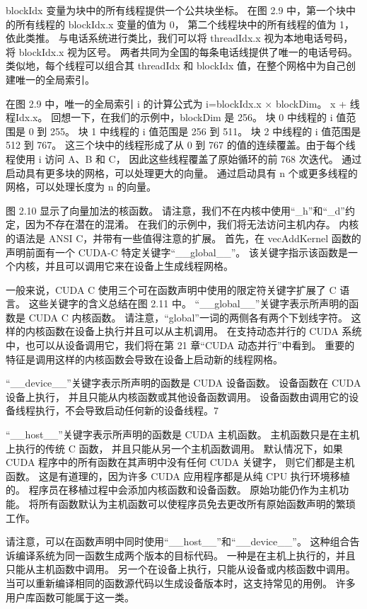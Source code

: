 blockIdx 变量为块中的所有线程提供一个公共块坐标。 在图 2.9 中，第一个块中的所有线程的 blockIdx.x 变量的值为 0，
第二个线程块中的所有线程的值为 1，依此类推。 与电话系统进行类比，我们可以将 threadIdx.x 视为本地电话号码，
将 blockIdx.x 视为区号。 两者共同为全国的每条电话线提供了唯一的电话号码。 
类似地，每个线程可以组合其 threadIdx 和 blockIdx 值，在整个网格中为自己创建唯一的全局索引。

在图 2.9 中，唯一的全局索引 i 的计算公式为 i=blockIdx.x × blockDim。 x + 线程Idx.x。 
回想一下，在我们的示例中，blockDim 是 256。 块 0 中线程的 i 值范围是 0 到 255。 
块 1 中线程的 i 值范围是 256 到 511。 块 2 中线程的 i 值范围是 512 到 767。 
这三个块中的线程形成了从 0 到 767 的值的连续覆盖。由于每个线程使用 i 访问 A、B 和 C，
因此这些线程覆盖了原始循环的前 768 次迭代。 通过启动具有更多块的网格，可以处理更大的向量。 
通过启动具有 n 个或更多线程的网格，可以处理长度为 n 的向量。

图 2.10 显示了向量加法的核函数。 请注意，我们不在内核中使用“\_h”和“\_d”约定，因为不存在潜在的混淆。 
在我们的示例中，我们将无法访问主机内存。 内核的语法是 ANSI C，并带有一些值得注意的扩展。 
首先，在 vecAddKernel 函数的声明前面有一个 CUDA-C 特定关键字“\_\_global\_\_”。 
该关键字指示该函数是一个内核，并且可以调用它来在设备上生成线程网格。

一般来说，CUDA C 使用三个可在函数声明中使用的限定符关键字扩展了 C 语言。 
这些关键字的含义总结在图 2.11 中。 “\_\_global\_\_”关键字表示所声明的函数是 CUDA C 内核函数。 
请注意，“global”一词的两侧各有两个下划线字符。 这样的内核函数在设备上执行并且可以从主机调用。 
在支持动态并行的 CUDA 系统中，也可以从设备调用它，我们将在第 21 章“CUDA 动态并行”中看到。 
重要的特征是调用这样的内核函数会导致在设备上启动新的线程网格。

“\_\_device\_\_”关键字表示所声明的函数是 CUDA 设备函数。 设备函数在 CUDA 设备上执行，
并且只能从内核函数或其他设备函数调用。 设备函数由调用它的设备线程执行，不会导致启动任何新的设备线程。7

“\_\_host\_\_”关键字表示所声明的函数是 CUDA 主机函数。 主机函数只是在主机上执行的传统 C 函数，
并且只能从另一个主机函数调用。 默认情况下，如果 CUDA 程序中的所有函数在其声明中没有任何 CUDA 关键字，
则它们都是主机函数。 这是有道理的，因为许多 CUDA 应用程序都是从纯 CPU 执行环境移植的。 
程序员在移植过程中会添加内核函数和设备函数。 原始功能仍作为主机功能。 
将所有函数默认为主机函数可以使程序员免去更改所有原始函数声明的繁琐工作。

请注意，可以在函数声明中同时使用“\_\_host\_\_”和“\_\_device\_\_”。 
这种组合告诉编译系统为同一函数生成两个版本的目标代码。 一种是在主机上执行的，并且只能从主机函数中调用。 
另一个在设备上执行，只能从设备或内核函数中调用。 当可以重新编译相同的函数源代码以生成设备版本时，这支持常见的用例。 
许多用户库函数可能属于这一类。


